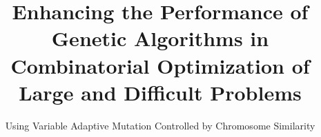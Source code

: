 \documentclass{sig-alternate}
\begin{document}
%

\title{Enhancing the Performance of Genetic Algorithms in Combinatorial Optimization of Large and Difficult Problems}
\subtitle{Using Variable Adaptive Mutation Controlled by Chromosome Similarity}
%
%
%
%
%
\end{document}
